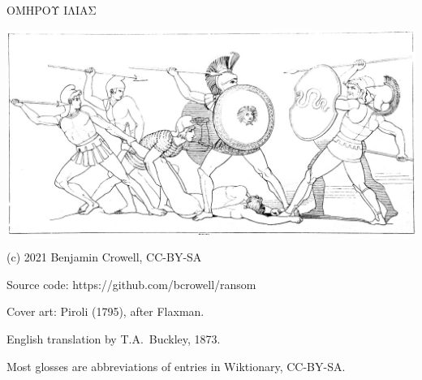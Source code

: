 \pagestyle{empty}

\vspace{25mm} %

\begin{center}

{\huge ΟΜΗΡΟΥ ΙΛΙΑΣ }

\vspace{10mm}

\includegraphics{iliad/figs/ajax-and-patroclus-body}

\vfill

\end{center}

\pagebreak

(c) 2021 Benjamin Crowell, CC-BY-SA

Source code: https://github.com/bcrowell/ransom

Cover art: Piroli (1795), after Flaxman.


English translation by T.A.~Buckley, 1873.

Most glosses are abbreviations of entries in Wiktionary, CC-BY-SA.
